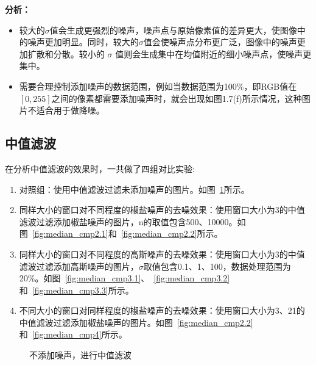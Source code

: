 \documentclass[lang=cn,10pt]{elegantbook}
\begin{document}
\begin{enumerate}[itemsep=1.5ex]
\vspace{12pt}
\quad \textcolor{second}{\textbf{分析：}}
\begin{itemize}
\item 较大的$\sigma$值会生成更强烈的噪声，噪声点与原始像素值的差异更大，使图像中的噪声更加明显。同时，较大的$\sigma $值会使噪声点分布更广泛，图像中的噪声更加扩散和分散。较小的 $\sigma$ 值则会生成集中在均值附近的细小噪声点，使噪声更集中。
\item 需要合理控制添加噪声的数据范围，例如当数据范围为100\%，即RGB值在$[0,255]$之间的像素都需要添加噪声时，就会出现如图1.7(f)所示情况，这种图片不适合用于做降噪。

\end{itemize}

 \end{enumerate}
 
\subsection{中值滤波}
在分析中值滤波的效果时，一共做了四组对比实验:
\vspace{5pt}
\begin{enumerate}[itemsep=1.5ex]

\item 对照组：使用中值滤波过滤未添加噪声的图片。如图~\ref{fig:median_cmp1}所示。

\item 同样大小的窗口对不同程度的椒盐噪声的去噪效果：使用窗口大小为3的中值滤波过滤添加椒盐噪声的图片，n的取值包含500、10000。如图~\ref{fig:median_cmp2.1}和~\ref{fig:median_cmp2.2}所示。

\item 同样大小的窗口对不同程度的高斯噪声的去噪效果：使用窗口大小为3的中值滤波过滤添加高斯噪声的图片，$\sigma$取值包含0.1、1、100，数据处理范围为20\%。如图~\ref{fig:median_cmp3.1}、~\ref{fig:median_cmp3.2}和~\ref{fig:median_cmp3.3}所示。

\item 不同大小的窗口对同样程度的椒盐噪声的去噪效果：使用窗口大小为3、21的中值滤波过滤添加椒盐噪声的图片。如图~\ref{fig:median_cmp2.2}和~\ref{fig:median_cmp4}所示。

\end{enumerate}

\begin{figure}[htbp]
	\centering
	\caption{不添加噪声，进行中值滤波}
	\label{fig:median_cmp1}
\end{figure}
\end{document}

